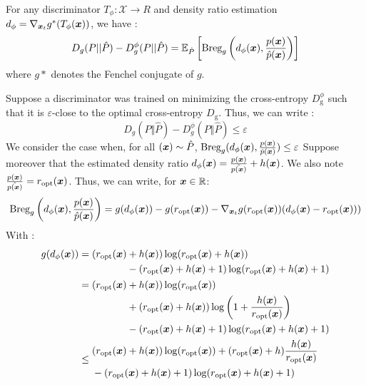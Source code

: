 \begin{theorem*}
    For any discriminator $T_{\phi} : \mathcal{X} \xrightarrow{} R$ and density ratio estimation $d_{\phi} = \nabla_{\boldsymbol{x}_t} g^{*}(T_{\phi}(\boldsymbol{x}))$, we have :
\begin{align}\label{thm1}
    D_{g}(P||\hat{P}) - D_{g}^{\phi}(P||\hat{P}) = \mathbb{E}_{\hat{P}}
    \left[
    \text{Breg}_{g}\left(d_{\phi}(\boldsymbol{x}),\frac{p(\boldsymbol{x})}{\hat{p}(\boldsymbol{x})}\right)
    \right]
\end{align}
where $g*$ denotes the Fenchel conjugate of $g$.
\end{theorem*}

Suppose a discriminator was trained on minimizing the cross-entropy $D_{\text{g}}^{\phi}$ such that it is $\varepsilon$-close to the optimal cross-entropy $D_{\text{g}}$. Thus, we can write : \begin{equation} \label{eq:bregmaneps}
D_{g}(P \Vert \hat{P}) - D_{g}^{\phi}(P \Vert \hat{P}) \leq \varepsilon
\end{equation}
We consider the case when, for all $(\boldsymbol{x}) \sim \hat{P}$, $\text{Breg}_{g}(d_{\phi}(\boldsymbol{x}),\frac{p(\boldsymbol{x})}{\hat{p}(\boldsymbol{x})}) \leq \varepsilon$
Suppose moreover that the estimated density ratio $d_{\phi}(\boldsymbol{x}) = \frac{p(\boldsymbol{x})}{\hat{p(\boldsymbol{x})}} + h(\boldsymbol{x})$. We also note $\frac{p(\boldsymbol{x})}{\hat{p(\boldsymbol{x})}} = r_{{\mathrm{opt}}}(\boldsymbol{x})$. Thus, we can write, for $\boldsymbol{x} \in \mathbb{R}$:
\[
\text{Breg}_{g}\left(d_{\phi}(\boldsymbol{x}),\frac{p(\boldsymbol{x})}{\hat{p}(\boldsymbol{x})}\right) = g(d_{\phi}(\boldsymbol{x})) - g(r_{{\mathrm{opt}}}(\boldsymbol{x})) - \nabla_{\boldsymbol{x}_t} g(r_{{\mathrm{opt}}}(\boldsymbol{x}))(d_{\phi}(\boldsymbol{x}) - r_{{\mathrm{opt}}}(\boldsymbol{x})))
\]
With : 
\begin{align}
g(d_{\phi}(\boldsymbol{x})) &=\begin{aligned}[t] (r_{{\mathrm{opt}}}(\boldsymbol{x})& + h(\boldsymbol{x}))\log(r_{{\mathrm{opt}}}(\boldsymbol{x}) + h(\boldsymbol{x}))\\
&- (r_{{\mathrm{opt}}}(\boldsymbol{x}) + h(\boldsymbol{x}) +1 )\log(r_{{\mathrm{opt}}}(\boldsymbol{x}) + h(\boldsymbol{x}) +1)\end{aligned}
    \\
    &=\begin{aligned}[t]
        (r_{{\mathrm{opt}}}(\boldsymbol{x})& + h(\boldsymbol{x}))\log (r_{{\mathrm{opt}}}(\boldsymbol{x})) \\
        &+ (r_{{\mathrm{opt}}}(\boldsymbol{x}) + h(\boldsymbol{x}))\log\left(1+ \frac{h(\boldsymbol{x})}{r_{{\mathrm{opt}}}(\boldsymbol{x})}\right) \\
        &- (r_{{\mathrm{opt}}}(\boldsymbol{x}) + h(\boldsymbol{x}) +1)\log(r_{{\mathrm{opt}}}(\boldsymbol{x}) + h(\boldsymbol{x}) +1)\end{aligned}
    \\
    &\leq
    \begin{aligned}&(r_{{\mathrm{opt}}}(\boldsymbol{x}) + h(\boldsymbol{x}))\log(r_{{\mathrm{opt}}}(\boldsymbol{x})) + (r_{{\mathrm{opt}}}(\boldsymbol{x})+h)\frac{h(\boldsymbol{x})}{r_{{\mathrm{opt}}}(\boldsymbol{x})}  \\
    &- (r_{{\mathrm{opt}}}(\boldsymbol{x}) + h(\boldsymbol{x}) +1)\log(r_{{\mathrm{opt}}}(\boldsymbol{x}) + h(\boldsymbol{x}) +1)\end{aligned}
    \label{eq:dl}
\end{align}

